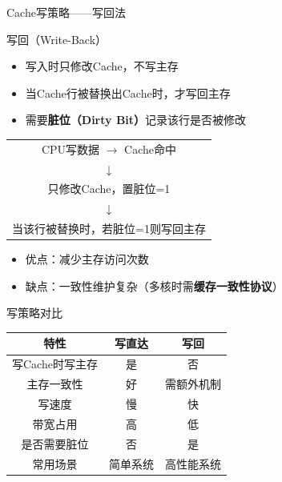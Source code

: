 \documentclass[10pt, aspectratio=169]{beamer}
\begin{document}
\begin{frame}{Cache写策略——写回法}
    \begin{block}{写回（Write-Back）}
        \begin{itemize}
            \item 写入时只修改Cache，不写主存
            \item 当Cache行被替换出Cache时，才写回主存
            \item 需要\textbf{脏位（Dirty Bit）}记录该行是否被修改
        \end{itemize}
    \end{block}
    \vspace{0.3em}
    \begin{center}
        \begin{tabular}{c}
            CPU写数据 $\to$ Cache命中 \\
            $\downarrow$ \\
            只修改Cache，置脏位=1 \\
            $\downarrow$ \\
            当该行被替换时，若脏位=1则写回主存
        \end{tabular}
    \end{center}
    \vspace{0.3em}
    \begin{itemize}
        \item 优点：减少主存访问次数
        \item 缺点：一致性维护复杂（多核时需\textbf{缓存一致性协议}）
    \end{itemize}
\end{frame}

\begin{frame}{写策略对比}
    \begin{center}
        \begin{tabular}{|c|c|c|}
            \hline
            \textbf{特性} & \textbf{写直达} & \textbf{写回} \\
            \hline
            写Cache时写主存 & 是 & 否 \\
            \hline
            主存一致性 & 好 & 需额外机制 \\
            \hline
            写速度 & 慢 & 快 \\
            \hline
            带宽占用 & 高 & 低 \\
            \hline
            是否需要脏位 & 否 & 是 \\
            \hline
            常用场景 & 简单系统 & 高性能系统 \\
            \hline
        \end{tabular}
    \end{center}
\end{frame}
\end{document}
